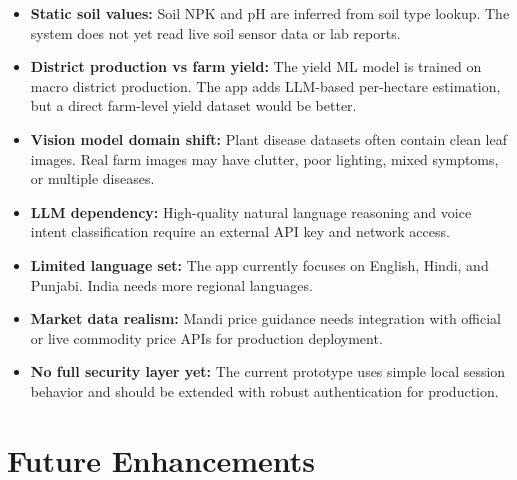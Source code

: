 \documentclass[12pt,a4paper]{report}
\begin{document}
\begin{itemize}[leftmargin=1.5em]
  \item \textbf{Static soil values:} Soil NPK and pH are inferred from soil type lookup. The system does not yet read live soil sensor data or lab reports.
  \item \textbf{District production vs farm yield:} The yield ML model is trained on macro district production. The app adds LLM-based per-hectare estimation, but a direct farm-level yield dataset would be better.
  \item \textbf{Vision model domain shift:} Plant disease datasets often contain clean leaf images. Real farm images may have clutter, poor lighting, mixed symptoms, or multiple diseases.
  \item \textbf{LLM dependency:} High-quality natural language reasoning and voice intent classification require an external API key and network access.
  \item \textbf{Limited language set:} The app currently focuses on English, Hindi, and Punjabi. India needs more regional languages.
  \item \textbf{Market data realism:} Mandi price guidance needs integration with official or live commodity price APIs for production deployment.
  \item \textbf{No full security layer yet:} The current prototype uses simple local session behavior and should be extended with robust authentication for production.
\end{itemize}

\section{Future Enhancements}
\end{document}
